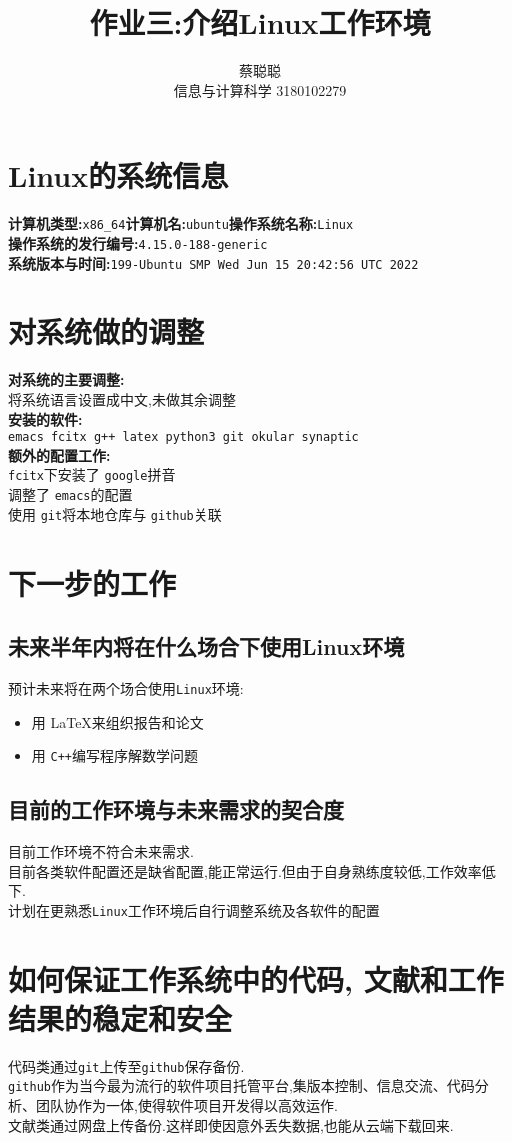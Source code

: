 \documentclass{ctexart}
\title{作业三:介绍Linux工作环境}
\author{蔡聪聪 \\ 信息与计算科学 3180102279}
\begin{document}
\maketitle

\section{Linux的系统信息}
\raggedright
\textbf{计算机类型:}\verb|x86_64|\quad \textbf{计算机名:}\verb|ubuntu|\quad \textbf{操作系统名称:}\verb|Linux|\\
\textbf{操作系统的发行编号:}\verb|4.15.0-188-generic|\\
\textbf{系统版本与时间:}\verb|199-Ubuntu SMP Wed Jun 15 20:42:56 UTC 2022|

\section{对系统做的调整}

\textbf{对系统的主要调整:}\\
将系统语言设置成中文,未做其余调整\\
\textbf{安装的软件:} \\
\verb|emacs fcitx g++ latex python3 git okular synaptic|\\
\textbf{额外的配置工作:}\\
\verb|fcitx|下安装了 \verb|google|拼音\\
调整了 \verb|emacs|的配置\\
使用 \verb|git|将本地仓库与 \verb|github|关联


\section{下一步的工作}

\subsection{未来半年内将在什么场合下使用Linux环境}
预计未来将在两个场合使用\verb|Linux|环境:
\begin{itemize}
\item 用 \LaTeX 来组织报告和论文
\item 用 \verb|C++|编写程序解数学问题
\end{itemize}


\subsection{目前的工作环境与未来需求的契合度}
目前工作环境不符合未来需求.\\
目前各类软件配置还是缺省配置,能正常运行.但由于自身熟练度较低,工作效率低下.\\
计划在更熟悉\verb|Linux|工作环境后自行调整系统及各软件的配置

\section{如何保证工作系统中的代码, 文献和工作结果的稳定和安全}

代码类通过\verb|git|上传至\verb|github|保存备份.\\
\verb|github|作为当今最为流行的软件项目托管平台,集版本控制、信息交流、代码分析、团队协作为一体,使得软件项目开发得以高效运作.\cite{zzCT2015}\\
文献类通过网盘上传备份.这样即使因意外丢失数据,也能从云端下载回来.



\end{document}
